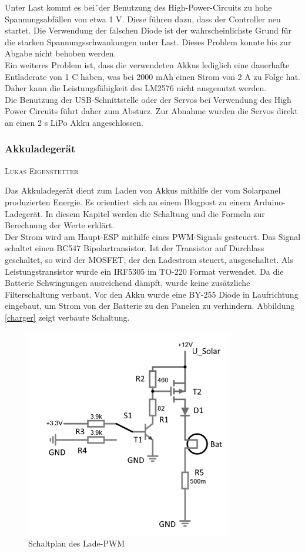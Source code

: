 \documentclass[12pt,a4paper,bibliography=totocnumbered,listof=totocnumbered]{article}
\makeatletter
\newcommand{\chapterauthor}[1]{%
  {\parindent0pt\vspace*{-5pt}%
  \linespread{1.1}\small\scshape#1%
  \par\nobreak\vspace*{3pt}}
  \@afterheading%
}
\makeatother
\begin{document}
Unter Last kommt es bei´der Benutzung des High-Power-Circuits zu hohe Spannungsabfällen von etwa 1 V.
Diese führen dazu, dass der Controller neu startet.
Die Verwendung der falschen Diode ist der wahrscheinlichste Grund für die starken Spannungsschwankungen unter Last.
Dieses Problem konnte bis zur Abgabe nicht behoben werden. \\
Ein weiteres Problem ist, dass die verwendeten Akkus lediglich eine dauerhafte Entladerate von 1 C haben, was bei 2000 mAh einen Strom von 2 A zu Folge hat.
Daher kann die Leistungsfähigkeit des LM2576 nicht ausgenutzt werden.\\
Die Benutzung der USB-Schnittstelle oder der Servos bei Verwendung des High Power Circuits führt daher zum Absturz.
Zur Abnahme wurden die Servos direkt an einen 2 s LiPo Akku angeschlossen.

\subsubsection{Akkuladegerät}\label{akkuCircuit}
\chapterauthor{Lukas Eigenstetter}
Das Akkuladegerät dient zum Laden von Akkus mithilfe der vom Solarpanel produzierten Energie.
Es orientiert sich an einem Blogpost zu einem Arduino-Ladegerät. \autocite{microfarat}
In diesem Kapitel werden die Schaltung und die Formeln zur Berechnung der Werte erklärt.\\
Der Strom wird am Haupt-ESP mithilfe eines PWM-Signals gesteuert.
Das Signal schaltet einen BC547 Bipolartransistor. \autocite{bipo}
Ist der Transistor auf Durchlass geschaltet, so wird der MOSFET, der den Ladestrom steuert, ausgeschaltet.
Als Leistungstransistor wurde ein IRF5305 im TO-220 Format verwendet. \autocite{irf}
Da die Batterie Schwingungen ausreichend dämpft, wurde keine zusätzliche Filterschaltung verbaut.
Vor den Akku wurde eine BY-255 Diode in Laufrichtung eingebaut, um Strom von der Batterie zu den Panelen zu verhindern.
Abbildung \autoref{charger} zeigt verbaute Schaltung. \\

\begin{figure}[htpb] %
    \centering
    \includegraphics[width=9cm,keepaspectratio=true]{pics/charger.png}
    \caption{Schaltplan des Lade-PWM}
    \label{charger}
\end{figure}
\end{document}

